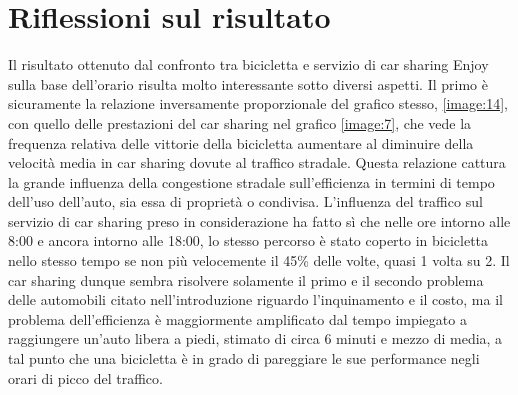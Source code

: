 \section{Riflessioni sul risultato}

Il risultato ottenuto dal confronto tra bicicletta e servizio di car sharing Enjoy sulla base dell'orario risulta molto interessante sotto diversi aspetti. Il primo è sicuramente la relazione inversamente proporzionale del grafico stesso, \ref{image:14}, con quello delle prestazioni del car sharing nel grafico \ref{image:7}, che vede la frequenza relativa delle vittorie della bicicletta aumentare al diminuire della velocità media in car sharing dovute al traffico stradale. Questa relazione cattura la grande influenza della congestione stradale sull'efficienza in termini di tempo dell'uso dell'auto, sia essa di proprietà o condivisa. L'influenza del traffico sul servizio di car sharing preso in considerazione ha fatto sì che nelle ore intorno alle 8:00 e ancora intorno alle 18:00, lo stesso percorso è stato coperto in bicicletta nello stesso tempo se non più velocemente il 45\% delle volte, quasi 1 volta su 2. Il car sharing dunque sembra risolvere solamente il primo e il secondo problema delle automobili citato nell'introduzione riguardo l'inquinamento e il costo, ma il problema dell'efficienza è maggiormente amplificato dal tempo impiegato a raggiungere un'auto libera a piedi, stimato di circa 6 minuti e mezzo di media, a tal punto che una bicicletta è in grado di pareggiare le sue performance negli orari di picco del traffico.

